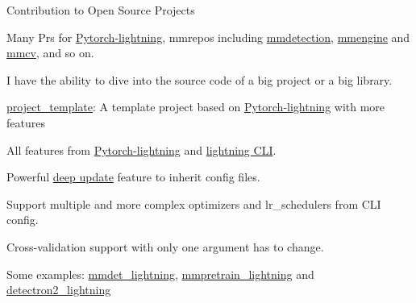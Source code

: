 
\begin{cventries}

	\cventry
	{} %
	{Contribution to Open Source Projects} %
	{\hfill} %
	{} %
	{
		\vspace{-3.5mm}
		\begin{cvitems} %
			\item{Many Prs for \href{https://github.com/Lightning-AI/lightning}{\textcolor{link}{Pytorch-lightning}}, mmrepos including \href{https://github.com/open-mmlab/mmdetection}{\textcolor{link}{mmdetection}}, \href{https://github.com/open-mmlab/mmengine}{\textcolor{link}{mmengine}} and \href{https://github.com/open-mmlab/mmcv}{\textcolor{link}{mmcv}}, and so on.}
			\item{I have the ability to dive into the source code of a big project or a big library.}
		\end{cvitems}
	}

	\cventry
	{} %
	{\href{https://github.com/shenmishajing/project_template}{\textcolor{link}{project\_template}}: A template project based on \href{https://github.com/Lightning-AI/lightning}{\textcolor{link}{Pytorch-lightning}} with more features} %
	{\hfill} %
	{} %
	{
		\vspace{-3.5mm}
		\begin{cvitems} %
			\item{All features from \href{https://github.com/Lightning-AI/lightning}{\textcolor{link}{Pytorch-lightning}} and \href{https://pytorch-lightning.readthedocs.io/en/stable/cli/lightning_cli.html}{\textcolor{link}{lightning CLI}}.}
			\item{Powerful \href{https://github.com/shenmishajing/lightning_template/blob/main/docs/configs/deep_update.md}{\textcolor{link}{deep update}} feature to inherit config files.}
			\item{Support multiple and more complex optimizers and lr\_schedulers from CLI config.}
			\item{Cross-validation support with only one argument has to change.}
		\end{cvitems}
		\vspace{3.5mm}
		Some examples: \href{https://github.com/shenmishajing/mmdet_lightning}{\textcolor{link}{mmdet\_lightning}}, \href{https://github.com/shenmishajing/mmpretrain_lightning}{\textcolor{link}{mmpretrain\_lightning}} and \href{https://github.com/shenmishajing/detectron2_lightning}{\textcolor{link}{detectron2\_lightning}}
	}

\end{cventries}
